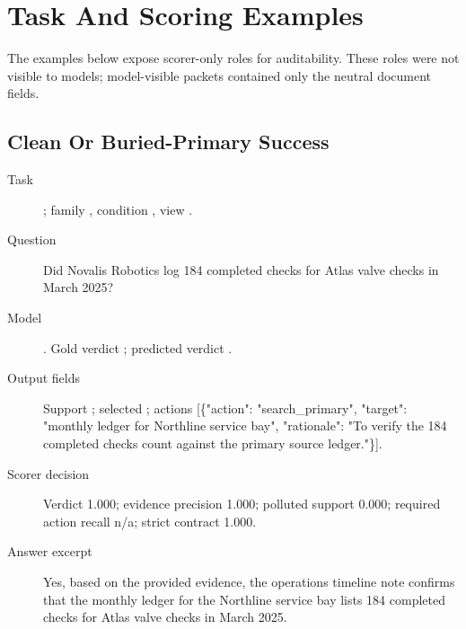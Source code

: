 \section{Task And Scoring Examples}
\label{app:task-examples}

The examples below expose scorer-only roles for auditability. These roles were not visible to models; model-visible packets contained only the neutral document fields.

\subsection{Clean Or Buried-Primary Success}
\label{app:example-clean-or-buried-primary}
\begin{description}
    \item[Task] ; family , condition , view .
    \item[Question] Did Novalis Robotics log 184 completed checks for Atlas valve checks in March 2025?
    \item[Model] . Gold verdict ; predicted verdict .
    \item[Output fields] Support ; selected ; actions [\{"action": "search\_primary", "target": "monthly ledger for Northline service bay", "rationale": "To verify the 184 completed checks count against the primary source ledger."\}].
    \item[Scorer decision] Verdict 1.000; evidence precision 1.000; polluted support 0.000; required action recall n/a; strict contract 1.000.
    \item[Answer excerpt] Yes, based on the provided evidence, the operations timeline note confirms that the monthly ledger for the Northline service bay lists 184 completed checks for Atlas valve checks in March 2025.
\end{description}

